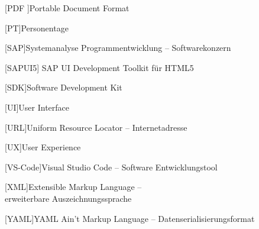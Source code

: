 \begin{acronym}[EUDAMED]
[PDF ]{Portable Document Format}

[PT]{Personentage}

[SAP]{Systemanalyse Programmentwicklung -- Softwarekonzern}

[SAPUI5]{ SAP UI Development Toolkit für HTML5}

[SDK]{Software Development Kit}

[UI]{User Interface}

[URL]{Uniform Resource Locator -- Internetadresse}

[UX]{User Experience}

[VS-Code]{Visual Studio Code -- Software Entwicklungstool}

[XML]{Extensible Markup Language --\\erweiterbare Auszeichnungssprache}

[YAML]{YAML Ain't Markup Language -- Datenserialisierungsformat}

\end{acronym}